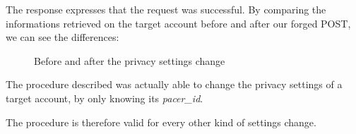 			\par The response expresses that the request was successful. \newline
			By comparing the informations retrieved on the target account before and after our forged POST, we can see the differences:
			\begin{figure}[ht]
				\centering
				\caption{Before and after the privacy settings change}
			\end{figure}
			\par The procedure described was actually able to change the privacy settings of a target account, by only knowing its \textit{pacer\_id}. \newline
			\par The procedure is therefore valid for every other kind of settings change.
			
